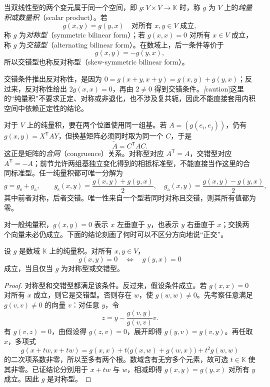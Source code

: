 \begin{definition}
\label{def:bilinear-scalar-product}
当双线性型的两个变元属于同一个空间，即 $g:V\times V\to\mathbb K$ 时，称 $g$ 为 $V$ 上的\emph{纯量积或数量积}（scalar product）。若
\[
    g(x,y)=g(y,x)\quad\text{对所有 }x,y\in V\text{ 成立},
\]
称 $g$ 为\emph{对称型}（symmetric bilinear form）；若 $g(x,x)=0$ 对所有 $x\in V$ 成立，称 $g$ 为\emph{交错型}（alternating bilinear form）。在数域上，后一条件等价于
\[
    g(x,y)=-g(y,x),
\]
所以交错型也称反对称型（skew-symmetric bilinear form）。
\end{definition}

交错条件推出反对称性，是因为 $0=g(x+y,x+y)=g(x,y)+g(y,x)$；反过来，反对称性给出 $2g(x,x)=0$，再由 $2\neq0$ 得到交错条件。\emph[caution]{这里的“纯量积”不要求正定、对称或非退化，也不涉及复共轭}，因此不能直接套用内积空间中依赖正定性的结论。

对于 $V$ 上的纯量积，要在两个位置使用同一组基。若 $A=(g(e_i,e_j))$，仍有 $g(x,y)=X^{\mathsf T}AY$，但换基矩阵必须同时取为同一个 $C$，于是
\begin{equation}
\label{eq:bilinear-congruence}
    \widetilde A=C^{\mathsf T}AC.
\end{equation}
这正是矩阵的\emph{合同}（congruence）关系。对称型对应 $A^{\mathsf T}=A$，交错型对应 $A^{\mathsf T}=-A$；前节允许两组基独立变化得到的相抵标准型，不能直接当作这里的合同标准型。任一纯量积都可唯一分解为
\[
    g=g_{\mathrm s}+g_{\mathrm a},\qquad
    g_{\mathrm s}(x,y)=\frac{g(x,y)+g(y,x)}2,\quad
    g_{\mathrm a}(x,y)=\frac{g(x,y)-g(y,x)}2,
\]
其中前者对称，后者交错。唯一性来自一个型若同时对称且交错，则其所有值都为零。

对一般纯量积，$g(x,y)=0$ 表示 $x$ 左垂直于 $y$，也表示 $y$ 右垂直于 $x$；交换两个向量未必仍成立。下面的结论刻画了何时可以不区分方向地说“正交”。

\begin{theorem}
\label{thm:bilinear-symmetric-orthogonality}
设 $g$ 是数域 $\mathbb K$ 上的纯量积。对所有 $x,y\in V$，
\[
    g(x,y)=0\quad\Longleftrightarrow\quad g(y,x)=0
\]
成立，当且仅当 $g$ 为对称型或交错型。
\end{theorem}

\begin{proof}
对称型和交错型都满足该条件。反过来，假设条件成立。若 $g(x,x)=0$ 对所有 $x$ 成立，则它是交错型。否则存在 $w$，使 $g(w,w)\neq0$。先考察任意满足 $g(v,v)\neq0$ 的向量 $v$：对任意 $y$，令
\[
    z=y-\frac{g(v,y)}{g(v,v)}v.
\]
有 $g(v,z)=0$，由假设得 $g(z,v)=0$，展开即得 $g(y,v)=g(v,y)$。再任取 $x$，多项式
\[
    g(x+tw,x+tw)
    =g(x,x)+t\bigl(g(x,w)+g(w,x)\bigr)+t^2g(w,w)
\]
的二次项系数非零，所以至多有两个根。数域含有无穷多个元素，故可选 $t\in\mathbb K$ 使其非零。已证结论分别用于 $x+tw$ 与 $w$，相减即得 $g(x,y)=g(y,x)$ 对所有 $y$ 成立。因此 $g$ 是对称型。
\end{proof}

